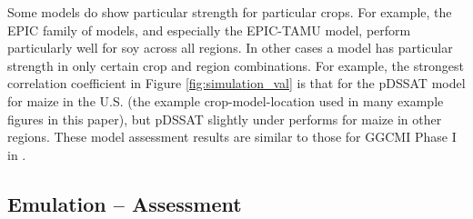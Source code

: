 \documentclass[esd, manuscript]{copernicus} %
\begin{document}
Some models do show particular strength for particular crops. For example, the EPIC family of models, and especially the EPIC-TAMU model, perform particularly well for soy across all regions. In other cases a model has particular strength in only certain crop and region combinations. For example, the strongest correlation coefficient in Figure \ref{fig:simulation_val} is that for the pDSSAT model for maize in the U.S. (the example crop-model-location used in many example figures in this paper), but pDSSAT slightly under performs for maize in other regions. These model assessment results are similar to those for GGCMI Phase I in \citet{muller_global_2017}.

\subsection{Emulation -- Assessment}
\label{A:2}
\end{document}
